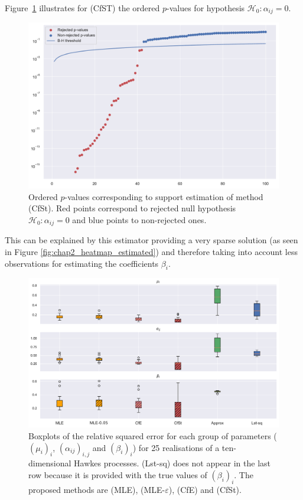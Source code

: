 Figure~\ref{fig:chap2_p_values_support} illustrates for (CfST) the ordered $p$-values for hypothesis $\mathcal{H}_0 : \alpha_{ij} = 0$.

{\begin{figure}[!ht]
     \centering
     \includegraphics[width=0.75\linewidth]{images/chapter3/p_values_10.pdf}
     \caption{Ordered $p$-values corresponding to support estimation of method (CfSt). Red points correspond to rejected null hypothesis $\mathcal{H}_0 : \alpha_{ij} = 0$ and blue points to non-rejected ones.}
     \label{fig:chap2_p_values_support}
     \end{figure}}

This can be explained by this estimator providing a very sparse solution (as seen in Figure \ref{fig:chap2_heatmap_estimated}) and therefore taking into account less observations for estimating the coefficients $\beta_i$.

{\begin{figure}[!ht]
     \centering
     \includegraphics[width=0.9\linewidth]{images/chapter3/boxplots_10_dim.pdf}
     \caption{Boxplots of the relative squared error for each group of parameters ($(\mu_i)_i$, $(\alpha_{ij})_{i,j}$ and $(\beta_i)_i$) for 25 realisations of a ten-dimensional Hawkes processes.
    (Lst-sq) does not appear in the last row because it is provided with the true values of \((\beta_i)_i\).
    The proposed methods are (MLE), (MLE-$\varepsilon$), (CfE) and (CfSt).}
     \label{fig:chap2_errors_10_dim}
     \end{figure}}

